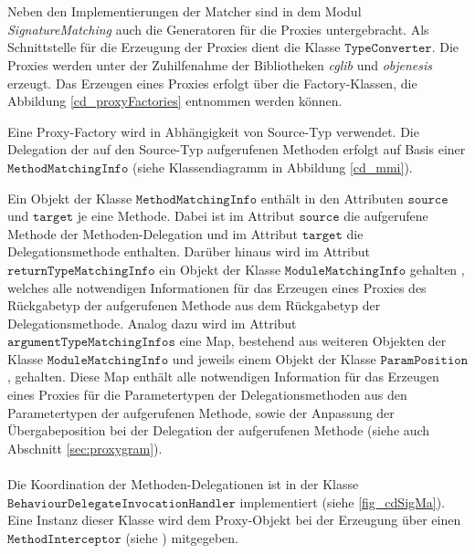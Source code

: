 \\\\
Neben den Implementierungen der Matcher sind in dem Modul \emph{SignatureMatching} auch die Generatoren für die Proxies untergebracht.  Als Schnittstelle für die Erzeugung der Proxies dient die Klasse $\texttt{TypeConverter}$. Die Proxies werden unter der Zuhilfenahme der Bibliotheken \emph{cglib} und \emph{objenesis} erzeugt. Das Erzeugen eines Proxies erfolgt über die Factory-Klassen, die Abbildung \ref{cd_proxyFactories} entnommen werden können.
\begin{figure}
\end{figure}\label{cd_proxyFactories}
Eine Proxy-Factory wird in Abhängigkeit von Source-Typ verwendet. Die Delegation der auf den Source-Typ aufgerufenen Methoden erfolgt auf Basis einer $\texttt{MethodMatchingInfo}$ (siehe Klassendiagramm in Abbildung \ref{cd_mmi}).
\begin{figure}
\end{figure}\label{cd_mmi}
\noindent
Ein Objekt der Klasse $\texttt{MethodMatchingInfo}$ enthält in den Attributen $\texttt{source}$ und $\texttt{target}$ je eine Methode. Dabei ist im Attribut $\texttt{source}$ die aufgerufene Methode der Methoden-Delegation und im Attribut $\texttt{target}$ die Delegationsmethode enthalten. Darüber hinaus wird im Attribut $\texttt{returnTypeMatchingInfo}$ ein Objekt der Klasse $\texttt{ModuleMatchingInfo}$ gehalten , welches alle notwendigen Informationen für das Erzeugen eines Proxies des Rückgabetyp der aufgerufenen Methode aus dem Rückgabetyp der Delegationsmethode. Analog dazu wird im Attribut $\texttt{argumentTypeMatchingInfos}$ eine Map, bestehend aus weiteren Objekten der Klasse $\texttt{ModuleMatchingInfo}$ und jeweils einem Objekt der Klasse $\texttt{ParamPosition}$, gehalten. Diese Map enthält alle notwendigen Information für das Erzeugen eines Proxies für die Parametertypen der Delegationsmethoden aus den Parametertypen der aufgerufenen Methode, sowie der Anpassung der Übergabeposition bei der Delegation der aufgerufenen Methode (siehe auch Abschnitt \ref{sec:proxygram}).
\\\\
Die Koordination der Methoden-Delegationen ist in der Klasse $\texttt{BehaviourDelegateInvocationHandler}$ implementiert (siehe \ref{fig_cdSigMa}). Eine Instanz dieser Klasse wird dem Proxy-Objekt bei der Erzeugung über einen $\texttt{MethodInterceptor}$ (siehe \cite{cglib_methodinterceptor}) mitgegeben.
